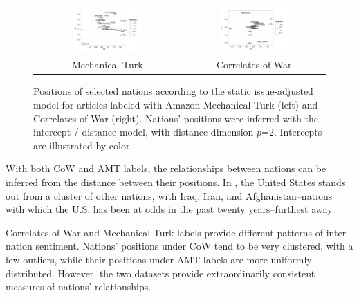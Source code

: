 \begin{figure}
  \begin{tabular}{cc}
    \includegraphics[width=0.5\textwidth]{chapter_foreign_relations/figures/011_static_positions_mturk.pdf} &
    \includegraphics[width=0.5\textwidth]{chapter_foreign_relations/figures/011_static_positions_cow.pdf}
    \\
    Mechanical Turk & Correlates of War \\
  \end{tabular}
  \caption{Positions of selected nations according to the static
    issue-adjusted model for articles labeled with Amazon Mechanical
    Turk (left) and Correlates of War (right).  Nations' positions
    were inferred with the intercept / distance model, with distance
    dimension $p$=2.  Intercepts are illustrated by color.}
  \label{fig:fr_intercept_distance_positions}
\end{figure}

With both CoW and AMT labels, the relationships between
nations can be inferred from the distance between their positions.
In , the United States stands
out from a cluster of other nations, with Iraq, Iran, and
Afghanistan--nations with which the U.S. has been at odds in the past
twenty years--furthest away.

Correlates of War and Mechanical Turk labels provide different
patterns of inter-nation sentiment.  Nations' positions under CoW
tend to be very clustered, with a few outliers, while their positions under
AMT labels are more uniformly distributed.  However, the two datasets
provide extraordinarily consistent measures of nations' relationships.

